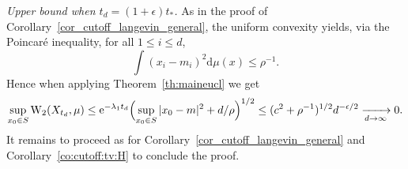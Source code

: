 \documentclass[10pt,reqno]{amsart}
\numberwithin{equation}{section}
\begin{document}
\emph{Upper bound when $t_d = (1+\epsilon)t_*$.} As in the proof of
Corollary~\ref{cor_cutoff_langevin_general}, the uniform convexity yields, via
the Poincaré inequality, for all $1\leq i\leq d$,
\begin{equation}
  \int(x_i - m_i)^2\mathrm{d}\mu(x) \leq \rho^{-1}.
\end{equation}
Hence when applying Theorem~\ref{th:maineucl} we get
\begin{equation}
  \sup_{x_0\in S}\mathrm{W}_2(X_{t_d},\mu) 
  \leq\mathrm{e}^{-\lambda_1t_d}\Bigl(\sup_{x_0\in S} |x_0-m|^2 + d/\rho\Bigr)^{1/2} 
  \leq (c^2 + \rho^{-1})^{1/2}d^{-\epsilon/2} 
  \xrightarrow[d\to\infty]{}0.
\end{equation}
It remains to proceed as for Corollary~\ref{cor_cutoff_langevin_general} and
Corollary~\ref{co:cutoff:tv:H} to conclude the proof.
\end{document}
